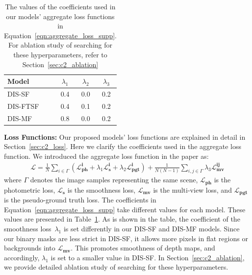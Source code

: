 \begin{table}[t]
    \begin{center}
        \begin{tabular}{lccc}
        \hline
        Model & $\lambda_{1}$ & $\lambda_{2}$ & $\lambda_{3}$ \\
        \hline
        DIS-SF & 0.4 & 0.0 & 0.2 \\
        DIS-FTSF & 0.4 & 0.1 & 0.2 \\
        DIS-MF & 0.8 & 0.0 & 0.2 \\
        \hline
        \end{tabular}
    \end{center}
    \caption{The values of the coefficients used in our models' aggregate loss functions in Equation~\eqref{eqn:aggregate_loss_supp}. For ablation study of searching for these hyperparameters, refer to Section~\ref{sec:c2_ablation}}
    \label{table:coef_supp}
\end{table}

\bigbreak\noindent\textbf{Loss Functions:} Our proposed models' loss functions are explained in detail in Section~\ref{sec:c2_loss}. Here we clarify the coefficients used in the aggregate loss function. We introduced the aggregate loss function in the paper as:
\begin{align}
     \boldsymbol{\mathcal{L}} = \frac{1}{N}\sum_{i \in \Gamma} (\boldsymbol{\mathcal{L}^{i}_{ph}} + \lambda_{1}\boldsymbol{\mathcal{L}^{i}_{s}} + \lambda_{2}\boldsymbol{\mathcal{L}^{i}_{pgt}})
    + \frac{1}{N(N-1)}\sum_{i,j \in \Gamma} \lambda_{3}\boldsymbol{\mathcal{L}^{ij}_{mv}}
    \label{eqn:aggregate_loss_supp}
\end{align}
where $\Gamma$ denotes the image samples representing the same scene, $\boldsymbol{\mathcal{L}_{ph}}$ is the photometric loss, $\boldsymbol{\mathcal{L}_s}$ is the smoothness loss, $\boldsymbol{\mathcal{L}_{mv}}$ is the multi-view loss, and $\boldsymbol{\mathcal{L}_{pgt}}$ is the pseudo-ground truth loss. The coefficients in Equation~\eqref{eqn:aggregate_loss_supp} take different values for each model. These values are presented in Table~\ref{table:coef_supp}. As is shown in the table, the coefficient of the smoothness loss~$\lambda_{1}$ is set differently in our DIS-SF and DIS-MF models. Since our binary masks are less strict in DIS-SF, it allows more pixels in flat regions or backgrounds into $\boldsymbol{\mathcal{L}_{mv}}$. This promotes smoothness of depth maps, and accordingly, $\lambda_{1}$ is set to a smaller value in DIS-SF. In Section~\ref{sec:c2_ablation}, we provide detailed ablation study of searching for these hyperparameters.

